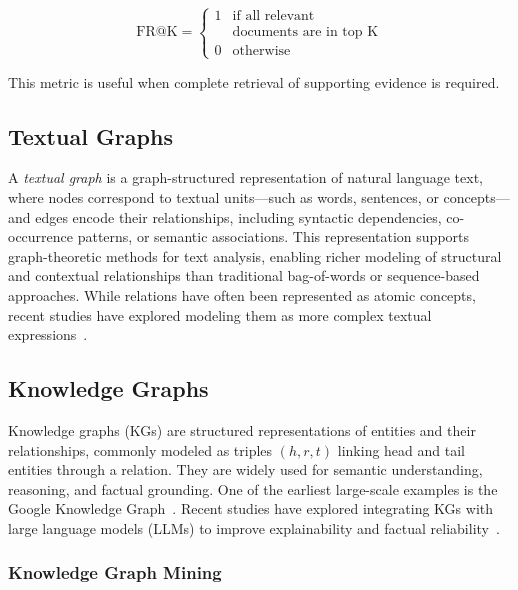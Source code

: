 \documentclass[11pt]{article}
\begin{document}
\[
\text{FR@K} =
\begin{cases}
1 & \text{if all relevant } \\
 & \text{documents
are in top K}\\
0 & \text{otherwise}
\end{cases}
\]

This metric is useful when complete retrieval of supporting evidence is required.


\subsection{Textual Graphs}

A \textit{textual graph} is a graph-structured representation of natural language text, where nodes correspond to textual units—such as words, sentences, or concepts—and edges encode their relationships, including syntactic dependencies, co-occurrence patterns, or semantic associations. This representation supports graph-theoretic methods for text analysis, enabling richer modeling of structural and contextual relationships than traditional bag-of-words or sequence-based approaches. While relations have often been represented as atomic concepts, recent studies have explored modeling them as more complex textual expressions~\cite{DBLP:conf/nips/LiGZLLH00Z24}.

\subsection{Knowledge Graphs}

Knowledge graphs (KGs) are structured representations of entities and their relationships, commonly modeled as triples $(h, r, t)$ linking head and tail entities through a relation. They are widely used for semantic understanding, reasoning, and factual grounding. One of the earliest large-scale examples is the Google Knowledge Graph~\cite{DBLP:journals/jices/Vang13}. Recent studies have explored integrating KGs with large language models (LLMs) to improve explainability and factual reliability~\cite{DBLP:journals/aim/ChaudhriBCDGHKL22}.

\subsubsection{Knowledge Graph Mining}
\end{document}

